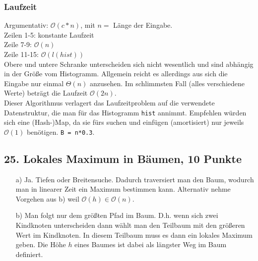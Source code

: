 \documentclass[ngerman,a4paper]{report}
\begin{document}
\begin{enumerate}
\subsubsection*{Laufzeit}
Argumentativ: $\mathcal{O}(c*n)$, mit $n=$ Länge der Eingabe.\\
Zeilen 1-5: konstante Laufzeit\\
Zeile 7-9: $\mathcal{O}(n)$\\
Zeile 11-15: $\mathcal{O}(l(hist))$\\

Obere und untere Schranke unterscheiden sich nicht wesentlich und sind abhängig in der Größe vom Histogramm. Allgemein reicht es allerdings aus sich die Eingabe nur einmal $\Theta(n)$ anzusehen. Im schlimmsten Fall (alles verschiedene Werte) beträgt die Laufzeit $\mathcal{O}(2n)$.\\
Dieser Algorithmus verlagert das Laufzeitproblem auf die verwendete Datenstruktur, die man für das Histogramm \lstinline!hist! annimmt. Empfehlen würden sich eine (Hash-)Map, da sie fürs suchen und einfügen (amortisiert) nur jeweils $\mathcal{O}(1)$ benötigen. 
\lstinline!B = n*0.3!.
\end{enumerate}

\subsection*{25. Lokales Maximum in Bäumen, 10 Punkte}
\begin{enumerate}
\item[a)] Ja. Tiefen oder Breitensuche. Dadurch traversiert man den Baum, wodurch man in linearer Zeit ein Maximum bestimmen kann. Alternativ nehme Vorgehen aus b) weil $\mathcal{O}(h) \in \mathcal{O}(n)$.
\item[b)] Man folgt nur dem größten Pfad im Baum. D.h. wenn sich zwei Kindknoten unterscheiden dann wählt man den Teilbaum mit den größeren Wert im Kindknoten. In diesem Teilbaum muss es dann ein lokales Maximum geben. Die Höhe $h$ eines Baumes ist dabei als längster Weg im Baum definiert. 
\end{enumerate}
\end{document}
